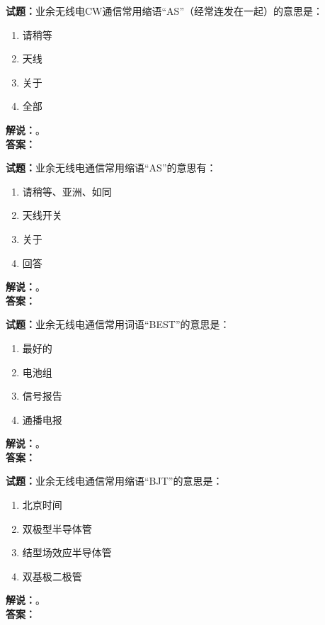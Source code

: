 \documentclass{ctexbook}
\begin{document}
\noindent\textbf{试题：}业余无线电CW通信常用缩语“AS”（经常连发在一起）的意思是：
\begin{enumerate}[leftmargin=3em]
\item 请稍等
\item 天线
\item 关于
\item 全部
\end{enumerate}
\noindent\textbf{解说：}\textbf{}。\\\noindent\textbf{答案：}

\bigskip




\noindent\textbf{试题：}业余无线电通信常用缩语“AS”的意思有：
\begin{enumerate}[leftmargin=3em]
\item 请稍等、亚洲、如同
\item 天线开关
\item 关于
\item 回答
\end{enumerate}
\noindent\textbf{解说：}\textbf{}。\\\noindent\textbf{答案：}

\bigskip




\noindent\textbf{试题：}业余无线电通信常用词语“BEST”的意思是：
\begin{enumerate}[leftmargin=3em]
\item 最好的
\item 电池组
\item 信号报告
\item 通播电报
\end{enumerate}
\noindent\textbf{解说：}\textbf{}。\\\noindent\textbf{答案：}

\bigskip




\noindent\textbf{试题：}业余无线电通信常用缩语“BJT”的意思是：
\begin{enumerate}[leftmargin=3em]
\item 北京时间
\item 双极型半导体管
\item 结型场效应半导体管
\item 双基极二极管
\end{enumerate}
\noindent\textbf{解说：}\textbf{}。\\\noindent\textbf{答案：}

\bigskip
\end{document}
